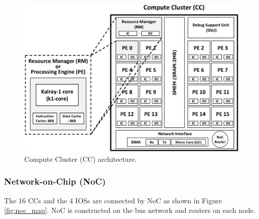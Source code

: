 \documentclass{sig-alternate-05-2015}
\begin{document}
\begin{figure}[t]
  \centering
  \includegraphics[width=1.0\linewidth]{../figure/cc_architecture.eps}
  \caption{\label{fig:cc_architecture}
    Compute Cluster (CC) architecture.}
\end{figure}


\subsubsection{Network-on-Chip (NoC)}
\label{sec:noc}
The 16 CCs and the 4 IOSs are connected by NoC as shown in Figure \ref{fig:noc_map}.
NoC is constructed on the bus network and routers on each node.
\end{document}
